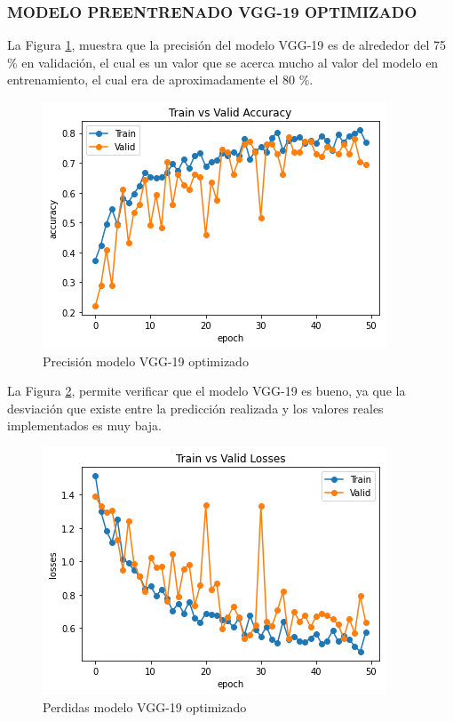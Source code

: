 \subsubsection{\MakeUppercase{Modelo preentrenado VGG-19 optimizado}}
La Figura \ref{fig:preci_vgg19_OPT}, muestra que la precisión del modelo VGG-19 es de alrededor del 75 \% en validación, el cual es un valor que se acerca mucho al valor del modelo en entrenamiento, el cual era de aproximadamente el 80 \%.
\begin{figure}[ht]
	\centering
	\includegraphics[scale=0.6]{Figs/504.png}
	\caption{Precisión modelo VGG-19 optimizado}
	\label{fig:preci_vgg19_OPT}
\end{figure}

La Figura \ref{fig:perdda_vgg19_opt}, permite verificar que el modelo VGG-19 es bueno, ya que la desviación que existe entre la predicción realizada y los valores reales implementados es muy baja.

\newpage
\begin{figure}[ht]
	\centering
	\includegraphics[scale=0.6]{Figs/505.png}
	\caption{Perdidas modelo VGG-19 optimizado}
	\label{fig:perdda_vgg19_opt}
\end{figure}

